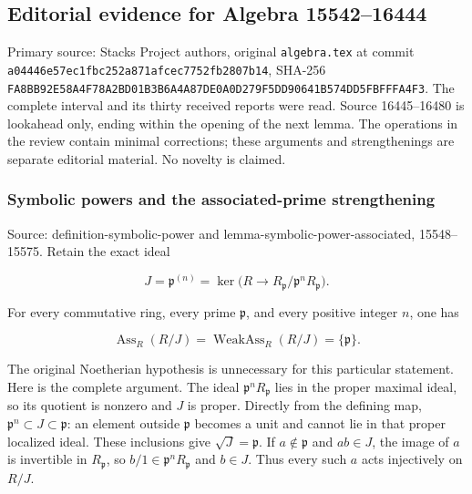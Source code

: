 \subsection{Editorial evidence for Algebra 15542--16444}\label{algebra-proof-005-editorial-evidence-for-algebra-1554216444}

Primary source: Stacks Project authors, original \texttt{algebra.tex} at commit \texttt{a044\allowbreak{}46e5\allowbreak{}7ec1\allowbreak{}fbc2\allowbreak{}52a8\allowbreak{}71af\allowbreak{}cec7\allowbreak{}752f\allowbreak{}b280\allowbreak{}7b14}, SHA-256 \texttt{FA8B\allowbreak{}B92E\allowbreak{}58A4\allowbreak{}F78A\allowbreak{}2BD0\allowbreak{}1B3B\allowbreak{}6A4A\allowbreak{}87DE\allowbreak{}0A0D\allowbreak{}279F\allowbreak{}5DD9\allowbreak{}0641\allowbreak{}B574\allowbreak{}DD5F\allowbreak{}BFFF\allowbreak{}A4F3}. The complete interval and its thirty received reports were read. Source 16445--16480 is lookahead only, ending within the opening of the next lemma. The operations in the review contain minimal corrections; these arguments and strengthenings are separate editorial material. No novelty is claimed.

\subsubsection{Symbolic powers and the associated-prime strengthening}\label{algebra-proof-005-symbolic-powers-and-the-associated-prime-strengthening}

Source: definition-\AlgebraIdentifierBreak{}symbolic-\AlgebraIdentifierBreak{}power and lemma-\AlgebraIdentifierBreak{}symbolic-\AlgebraIdentifierBreak{}power-\AlgebraIdentifierBreak{}associated, 15548--15575. Retain the exact ideal

\[
J=\mathfrak p^{(n)}=\ker\bigl(R\longrightarrow R_{\mathfrak p}/\mathfrak p^nR_{\mathfrak p}\bigr).
\]

For every commutative ring, every prime \(\mathfrak p\), and every positive integer \(n\), one has

\[
\operatorname{Ass}_R(R/J)=\operatorname{WeakAss}_R(R/J)=\{\mathfrak p\}.
\]

The original Noetherian hypothesis is unnecessary for this particular statement. Here is the complete argument. The ideal \(\mathfrak p^nR_{\mathfrak p}\) lies in the proper maximal ideal, so its quotient is nonzero and \(J\) is proper. Directly from the defining map, \(\mathfrak p^n\subset J\subset\mathfrak p\): an element outside \(\mathfrak p\) becomes a unit and cannot lie in that proper localized ideal. These inclusions give \(\sqrt J=\mathfrak p\). If \(a\notin\mathfrak p\) and \(ab\in J\), the image of \(a\) is invertible in \(R_{\mathfrak p}\), so \(b/1\in\mathfrak p^nR_{\mathfrak p}\) and \(b\in J\). Thus every such \(a\) acts injectively on \(R/J\).

